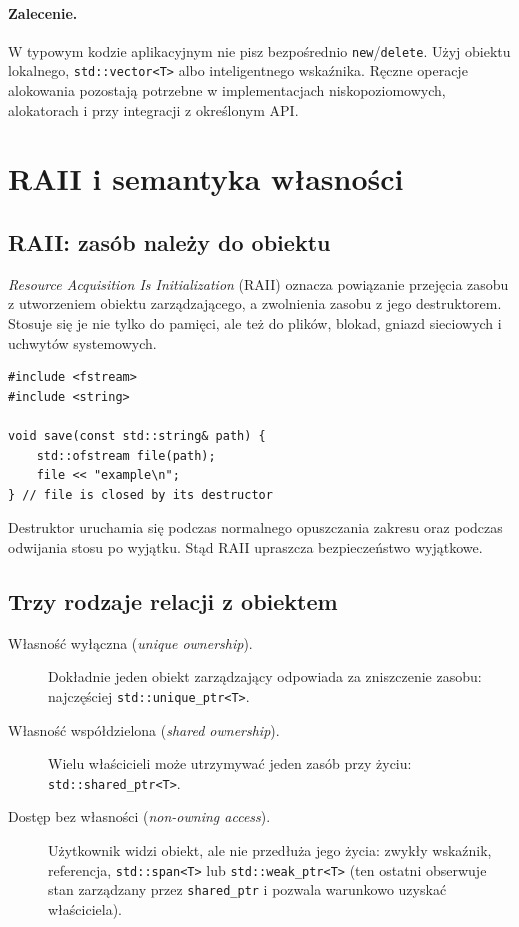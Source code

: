 \paragraph{Zalecenie.}
W typowym kodzie aplikacyjnym nie pisz bezpośrednio
\texttt{new}/\texttt{delete}. Użyj obiektu lokalnego,
\texttt{std::vector<T>} albo inteligentnego wskaźnika.
Ręczne operacje alokowania pozostają potrzebne w implementacjach
niskopoziomowych, alokatorach i przy integracji z określonym API.

\section{RAII i semantyka własności}

\subsection{RAII: zasób należy do obiektu}

\emph{Resource Acquisition Is Initialization} (RAII) oznacza
powiązanie przejęcia zasobu z utworzeniem obiektu zarządzającego,
a zwolnienia zasobu z jego destruktorem. Stosuje się je nie tylko
do pamięci, ale też do plików, blokad, gniazd sieciowych i uchwytów
systemowych.

\begin{lstlisting}
#include <fstream>
#include <string>

void save(const std::string& path) {
    std::ofstream file(path);
    file << "example\n";
} // file is closed by its destructor
\end{lstlisting}

Destruktor uruchamia się podczas normalnego opuszczania zakresu
oraz podczas odwijania stosu po wyjątku. Stąd RAII upraszcza
bezpieczeństwo wyjątkowe.

\subsection{Trzy rodzaje relacji z obiektem}

\begin{description}
    \item[Własność wyłączna (\emph{unique ownership}).]
    Dokładnie jeden obiekt zarządzający odpowiada za zniszczenie
    zasobu: najczęściej \texttt{std::unique\_ptr<T>}.
    \item[Własność współdzielona (\emph{shared ownership}).]
    Wielu właścicieli może utrzymywać jeden zasób przy życiu:
    \texttt{std::shared\_ptr<T>}.
    \item[Dostęp bez własności (\emph{non-owning access}).]
    Użytkownik widzi obiekt, ale nie przedłuża jego życia:
    zwykły wskaźnik, referencja, \texttt{std::span<T>} lub
    \texttt{std::weak\_ptr<T>} (ten ostatni obserwuje stan
    zarządzany przez \texttt{shared\_ptr} i pozwala warunkowo
    uzyskać właściciela).
\end{description}

